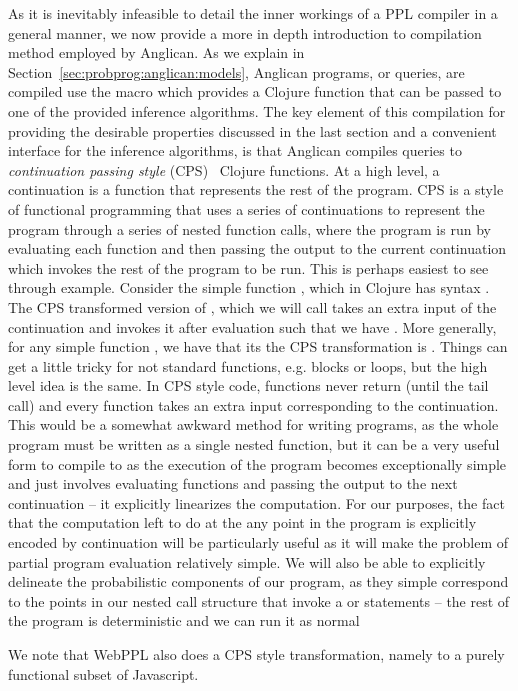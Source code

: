 As it is inevitably infeasible to detail the inner workings of a PPL compiler in a general
manner, we now provide a more in depth introduction to compilation method
employed by Anglican.  As we explain in Section~\ref{sec:probprog:anglican:models},
Anglican programs, or queries, are compiled use the macro \query which provides a
Clojure function that can be passed to one of the provided inference algorithms.
The key element of this compilation for providing the desirable properties discussed
in the last section and a convenient interface for the inference algorithms, is that
Anglican compiles queries to \emph{continuation passing style} (CPS)~\citep{appel1989continuation}
Clojure functions.  At a high level, a continuation is a function that represents the rest of the
program.  CPS is a style of functional programming that uses a series of continuations
to represent the program through a series of nested function calls, where the program
is run by evaluating each function and then passing the output to the current continuation
which invokes the rest of the program to be run.  This is perhaps easiest to see through
example.  Consider the simple function \clj{+}, which in Clojure has syntax .  The
CPS transformed version of \clj{+}, which we will call \clj{+&} takes an extra input
of the continuation  and invokes it after evaluation such that we have
.  More generally, for any simple function , we have
that its the CPS transformation is .  Things can get a little
tricky for not standard functions, e.g.  blocks or loops, but the high level idea is the same.
In CPS style code, functions never return (until the tail call) and every function takes an
extra input corresponding to the continuation.  This would be a somewhat awkward method for
writing programs, as the whole program must be written as a single nested function, but
it can be a very useful form to compile to as the execution of the program becomes
exceptionally simple and just involves evaluating functions and passing the output to the
next continuation -- it explicitly linearizes the computation.  For our purposes, the fact
that the computation left to do at the any point in the program is explicitly encoded by
continuation will be particularly useful as it will make the problem of partial program
evaluation relatively simple.  We will also be able to explicitly delineate the probabilistic
components of our program, as they simple correspond to the points in our nested call
structure that invoke a \sample or \observe statements -- the rest of the program is
deterministic and we can run it as normal

We note that WebPPL also does a CPS style transformation, namely to a purely functional
subset of Javascript.